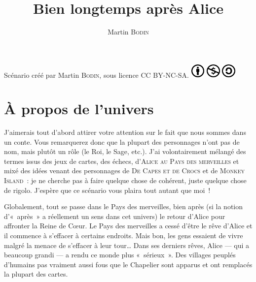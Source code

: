 \title{Bien longtemps après Alice}
\author{Martin \textsc{Bodin}}
\date{}



\maketitle

\tableofcontents

\vfill

\hfill
Scénario créé par Martin \textsc{Bodin}, sous licence CC BY-NC-SA.
\hfill
\includegraphics[width = 20pt]{images/licence/cc-by.png}
\includegraphics[width = 20pt]{images/licence/cc-nc.png}
\includegraphics[width = 20pt]{images/licence/cc-sa.png}

\newpage

\section{À propos de l’univers}

J’aimerais tout d’abord attirer votre attention sur le fait que nous sommes dans un conte.
Vous remarquerez donc que la plupart des personnages n’ont pas de nom, mais plutôt un rôle (le Roi, le Sage, etc.).
J’ai volontairement mélangé des termes issus des jeux de cartes, des échecs, d’\textsc{Alice au Pays des merveilles} et mixé des idées venant des personnages de \textsc{De Capes et de Crocs} et de \textsc{Monkey Island}~:  je ne cherche pas à faire quelque chose de cohérent, juste quelque chose de rigolo.
J’espère que ce scénario vous plaira tout autant que moi~!

Globalement, tout se passe dans le Pays des merveilles, bien après (si la notion d’«~après~» a réellement un sens dans cet univers) le retour d’Alice pour affronter la Reine de Cœur.
Le Pays des merveilles a cessé d’être le rêve d’Alice et il commence à s’effacer à certains endroits.
Mais bon, les gens essaient de vivre malgré la menace de s’effacer à leur tour…
Dans ses derniers rêves, Alice — qui a beaucoup grandi — a rendu ce monde plus «~sérieux~».
Des villages peuplés d’humains pas vraiment aussi fous que le Chapelier sont apparus et ont remplacés la plupart des cartes.

